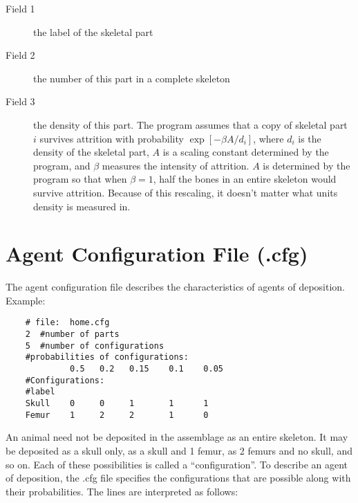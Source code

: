 \begin{description}

\item[Field 1]
the label of the skeletal part

\item[Field 2]
the number of this part in a complete skeleton

\item[Field 3] the density of this part.  The program assumes that a copy of
  skeletal part $i$ survives attrition with probability $\exp[-\beta A/d_i]$,
  where $d_i$ is the density of the skeletal part, $A$ is a scaling constant
  determined by the program, and $\beta$ measures the intensity of attrition.
  $A$ is determined by the program so that when $\beta=1$, half the bones in
  an entire skeleton would survive attrition.  Because of this rescaling, it
  doesn't matter what units density is measured in.

\end{description}

\section{Agent Configuration File (.cfg)\label{sec.cfg}}%

The agent configuration file describes the characteristics of agents
of deposition.  Example:
\begin{verbatim}
    # file:  home.cfg
    2  #number of parts
    5  #number of configurations
    #probabilities of configurations:
             0.5   0.2   0.15    0.1    0.05
    #Configurations:
    #label              
    Skull    0     0     1       1      1
    Femur    1     2     2       1      0
\end{verbatim}

An animal need not be deposited in the assemblage as an entire skeleton.  It
may be deposited as a skull only, as a skull and 1 femur, as 2 femurs and no
skull, and so on.  Each of these possibilities is called a ``configuration''.
To describe an agent of deposition, the .cfg file specifies the configurations
that are possible along with their probabilities.  The lines are interpreted
as follows:

